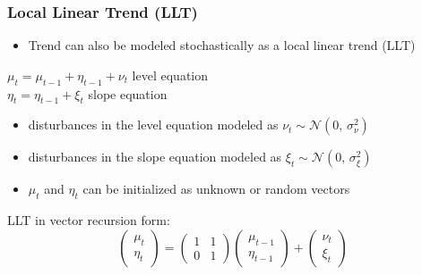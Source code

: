 \documentclass{beamer}
\begin{document}
\begin{frame}[t]\frametitle{Local Linear Trend (LLT)}
\begin{itemize}
\item Trend can also be modeled stochastically as a local linear trend (LLT)
\end{itemize}
\bigskip
\hspace{30pt} $\mu_{t} = \mu_{t-1} + \eta_{t-1} + \nu_{t}$ \hspace{30pt} level equation \\
\hspace{30pt} $\eta_{t} = \eta_{t-1} + \xi_{t}$ \hspace{67pt} slope equation
\bigskip
\begin{itemize}
\item disturbances in the level equation modeled as $\nu_{t} \sim \mathcal{N}(0,\,\sigma^{2}_{\nu})$
\item disturbances in the slope equation modeled as $\xi_{t} \sim \mathcal{N}(0,\,\sigma^{2}_{\xi})$
\item $\mu_{t}$ and $\eta_{t}$ can be initialized as unknown or random vectors
\end{itemize}
\bigskip
LLT in vector recursion form: \\
\begin{equation*}
\begin{pmatrix}
\mu_{t}\\
 \eta_{t}
\end{pmatrix}
=
\begin{pmatrix}
1 & 1\\
0 & 1
\end{pmatrix}
\begin{pmatrix}
\mu_{t-1}\\
 \eta_{t-1}
\end{pmatrix}
+
\begin{pmatrix}
\nu_{t}\\
 \xi_{t}
\end{pmatrix}
\end{equation*}
\end{frame}
\end{document}
